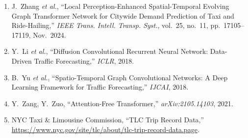 \documentclass{rapportECL}
\begin{document}
\begin{enumerate}[leftmargin=*]
    \item J.~Zhang \textit{et al.}, ``Local Perception-Enhanced Spatial-Temporal Evolving Graph Transformer Network for Citywide Demand Prediction of Taxi and Ride-Hailing,'' \textit{IEEE Trans. Intell. Transp. Syst.}, vol.~25, no.~11, pp.~17105--17119, Nov.~2024.
    \item Y.~Li \textit{et al.}, ``Diffusion Convolutional Recurrent Neural Network: Data-Driven Traffic Forecasting,'' \textit{ICLR}, 2018.
    \item B.~Yu \textit{et al.}, ``Spatio-Temporal Graph Convolutional Networks: A Deep Learning Framework for Traffic Forecasting,'' \textit{IJCAI}, 2018.
    \item Y.~Zang, Y.~Zuo, ``Attention-Free Transformer,'' \textit{arXiv:2105.14103}, 2021.
    \item NYC Taxi \& Limousine Commission, ``TLC Trip Record Data,'' \url{https://www.nyc.gov/site/tlc/about/tlc-trip-record-data.page}.
\end{enumerate}
\end{document}
